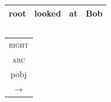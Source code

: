 \documentclass[t]{beamer}
\begin{document}
\begin{frame}
{\begin{varwidth}{2.2\linewidth}
{	\begin{tabular}{|l|l|l|l|}\hline
	\color{red} root & \color{red} looked & \color{red} at & \color{red} Bob \\ \hline
	\end{tabular}
	\hspace{6mm}
	\begin{tabular}{|l|}\hline
	\quad \\ \hline
	\end{tabular}
	}
	\begin{tabular}{c}\textsc{right}\\ \textsc{arc}\\{\footnotesize pobj}\\$\rightarrow$\end{tabular}
	
    \vspace{5mm}
	

\end{varwidth}}
\end{frame}
\end{document}
